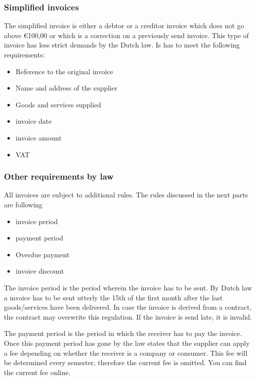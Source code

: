 \documentclass{report}
\begin{document}
\subsubsection{Simplified invoices}\label{subsec:simplified_invoice}
The simplified invoice is either a debtor or a creditor invoice which does not go above \euro100,00 or which is a correction on a previously send invoice.
This type of invoice has less strict demands by the Dutch law. Is has to meet the following requirements:
\begin{itemize}
	\item Reference to the original invoice
	\item Name and address of the supplier
	\item Goods and services supplied 
	\item invoice date
	\item invoice amount
	\item VAT
\end{itemize}
 
\subsubsection{Other requirements by law}
All invoices are subject to additional rules. The rules discussed in the next parts are following
\begin{itemize}
	\item invoice period
	\item payment period
	\item Overdue payment
	\item invoice discount
\end{itemize}

The invoice period is the period wherein the invoice has to be sent. By Dutch law a invoice has to be sent utterly the 15th of the first month after the last goods/services have been delivered. In case the invoice is derived from a contract, the contract may overwrite this regulation. If the invoice is send late, it is invalid.

The payment period is the period in which the receiver has to pay the invoice. Once this payment period has gone by the law states that the supplier can apply a fee depending on whether the receiver is a company or consumer. This fee will be determined every semester, therefore the current fee is omitted. You can find the current fee online.
\end{document}
